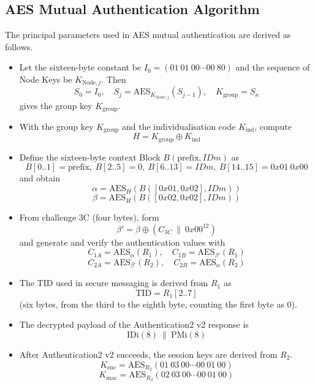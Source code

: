 \documentclass[a4paper,11pt]{report}
\begin{document}
\subsection{AES Mutual Authentication Algorithm}

The principal parameters used in AES mutual authentication are derived as follows.

\begin{itemize}
    \item Let the sixteen-byte constant be $I_0 = (01\ 01\ 00\cdots00\ 80)$ and the sequence of Node Keys be $K_{\mathrm{Node},j}$. Then
          \[
              S_0 = I_0,\quad
              S_j = \mathrm{AES}_{K_{\mathrm{Node},j}}(S_{j-1}),\quad
              K_{\mathrm{group}} = S_n
          \]
          gives the group key $K_{\mathrm{group}}$.
    \item With the group key $K_{\mathrm{group}}$ and the individualisation code $K_{\mathrm{ind}}$, compute
          \[
              H = K_{\mathrm{group}} \oplus K_{\mathrm{ind}}
          \]
    \item Define the sixteen-byte context Block $B(\mathrm{prefix},IDm)$ as
          \[
              B[0..1]=\mathrm{prefix},\
              B[2..5]=0,\
              B[6..13]=IDm,\
              B[14..15]=0x01\ 0x00
          \]
          and obtain
          \[
              \alpha = \mathrm{AES}_{H}(B([0x01,0x02],IDm))
          \]
          \[
              \beta  = \mathrm{AES}_{H}(B([0x02,0x02],IDm))
          \]
    \item From challenge 3C (four bytes), form
          \[
              \beta' = \beta \oplus (C_{3C}\ \|\ 0x00^{12})
          \]
          and generate and verify the authentication values with
          \[
              C_{1A}=\mathrm{AES}_{\alpha}(R_1),\quad
              C_{1B}=\mathrm{AES}_{\beta'}(R_1)
          \]
          \[
              C_{2A}=\mathrm{AES}_{\beta'}(R_2),\quad
              C_{2B}=\mathrm{AES}_{\alpha}(R_2)
          \]
    \item The TID used in secure messaging is derived from $R_1$ as
          \[
              \mathrm{TID}=R_1[2..7]
          \]
          (six bytes, from the third to the eighth byte, counting the first byte as 0).
    \item The decrypted payload of the Authentication2 v2 response is
          \[
              \mathrm{IDi}(8)\ \|\ \mathrm{PMi}(8)
          \]
    \item After Authentication2 v2 succeeds, the session keys are derived from $R_2$.
          \[
              K_{\mathrm{enc}}=\mathrm{AES}_{R_2}(01\ 03\ 00\cdots00\ 01\ 00)
          \]
          \[
              K_{\mathrm{mac}}=\mathrm{AES}_{R_2}(02\ 03\ 00\cdots00\ 01\ 00)
          \]
\end{itemize}
\end{document}
